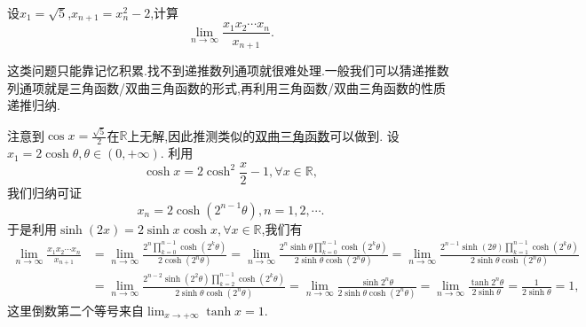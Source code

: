 \documentclass[../../main.tex]{subfiles}%
\begin{document}
\begin{example}
设\(x_1 = \sqrt{5}\),\(x_{n + 1}=x_{n}^{2}-2\),计算
\[
\lim_{n\rightarrow\infty}\frac{x_1x_2\cdots x_n}{x_{n + 1}}.
\]
\end{example}
\begin{note}
这类问题只能靠记忆积累.找不到递推数列通项就很难处理.一般我们可以猜递推数列通项就是三角函数/双曲三角函数的形式,再利用三角函数/双曲三角函数的性质递推归纳.
\end{note}
\begin{solution}

注意到\(\cos x=\frac{\sqrt{5}}{2}\)在\(\mathbb{R}\)上无解,因此推测类似的\href{https://baike.baidu.com/item/%E5%8F%8C%E6%9B%B2%E5%87%BD%E6%95%B0/8704306}{双曲三角函数}可以做到.
设\(x_1 = 2\cosh\theta,\theta\in(0,+\infty)\). 利用
\[
\cosh x=2\cosh^{2}\frac{x}{2}-1,\forall x\in\mathbb{R},
\]
我们归纳可证
\[
x_n=2\cosh(2^{n - 1}\theta),n = 1,2,\cdots.
\]
于是利用\(\sinh(2x)=2\sinh x\cosh x,\forall x\in\mathbb{R}\),我们有
\begin{align*}
\lim_{n\rightarrow\infty}\frac{x_1x_2\cdots x_n}{x_{n + 1}}&=\lim_{n\rightarrow\infty}\frac{2^{n}\prod\limits_{k = 0}^{n - 1}\cosh(2^{k}\theta)}{2\cosh(2^{n}\theta)}=\lim_{n\rightarrow\infty}\frac{2^{n}\sinh\theta\prod\limits_{k = 0}^{n - 1}\cosh(2^{k}\theta)}{2\sinh\theta\cosh(2^{n}\theta)}=\lim_{n\rightarrow\infty}\frac{2^{n - 1}\sinh(2\theta)\prod\limits_{k = 1}^{n - 1}\cosh(2^{k}\theta)}{2\sinh\theta\cosh(2^{n}\theta)}\\
&=\lim_{n\rightarrow\infty}\frac{2^{n - 2}\sinh(2^{2}\theta)\prod\limits_{k = 2}^{n - 1}\cosh(2^{k}\theta)}{2\sinh\theta\cosh(2^{n}\theta)}=\lim_{n\rightarrow\infty}\frac{\sinh2^{n}\theta}{2\sinh\theta\cosh(2^{n}\theta)}=\lim_{n\rightarrow\infty}\frac{\tanh2^{n}\theta}{2\sinh\theta}=\frac{1}{2\sinh\theta}=1,
\end{align*}
这里倒数第二个等号来自\(\lim_{x\rightarrow+\infty}\tanh x = 1\).

\end{solution}
\end{document}
